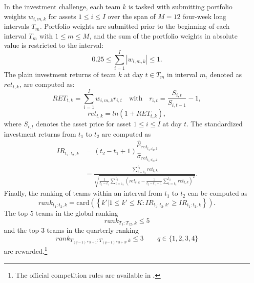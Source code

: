 \documentclass[3p,times,twocolumn]{elsarticle}
\begin{document}
In the investment challenge, each team $k$ is tasked with submitting portfolio weights $w_{i,m,k}$ for assets $1 \leq i \leq I$ over the span of $M=12$ four-week long intervals $T_{m}$.
Portfolio weights are submitted prior to the beginning of each interval $T_{m}$ with $1 \leq m \leq M$, and the sum of the portfolio weights in absolute value is restricted to the interval:
\begin{equation}
    0.25 \leq \sum_{i=1}^{I}|w_{i,m,k}|\leq 1.
\end{equation}
The plain investment returns of team $k$ at day $t \in T_m$ in interval $m$, denoted as $ret_{t,k}$, are computed as:
\begin{equation}
    RET_{t,k}= \sum_{i=1}^{I} w_{i,m,k} r_{i,t} \quad \text{with} \quad r_{i,t}=\frac{S_{i,t}}{S_{i,t-1}}-1,
\end{equation}
\begin{equation}\label{eq:log_transform}
    ret_{t,k}= ln(1+RET_{t,k}),
\end{equation}
where $S_{i,t}$ denotes the asset price for asset $1 \leq i \leq I$ at day $t$.
The standardized investment returns from $t_1$ to $t_2$ are computed as
\begin{equation}\label{eq:ir_definition}
    \begin{split}
        IR_{t_1:t_2,k}&= (t_2-t_1+1)\dfrac{\widehat{\mu}_{ret_{t_1:t_2,k}}}{\widehat{\sigma}_{ret_{t_1:t_2,k}}}\\
        &= \frac{\sum\limits_{t=t_1}^{t_{2}} ret_{t,k}}{\sqrt{\frac{1}{t_2 - t_1}\sum\limits_{t=t_1}^{t_2}\left( ret_{t,k} - \frac{1}{t_2 - t_1 + 1}\sum\limits_{t=t_1}^{t_{2}} ret_{t,k} \right)^{2}}}.
    \end{split}
\end{equation}
Finally, the ranking of teams within an interval from $t_1$ to $t_2$ can be computed as
\begin{equation}
    rank_{t_1:t_2,k}=\textrm{card}(\left\{ k'| 1 \leq k' \leq K: IR_{t_1:t_2,k'} \geq IR_{t_1:t_2,k} \right\}).
\end{equation}
The top 5 teams in the global ranking
\begin{equation}
    rank_{T_{1}:T_{12},k} \leq 5
\end{equation}
and the top 3 teams in the quarterly ranking
\begin{equation}
    rank_{T_{(q-1)*3+1}:T_{(q-1)*3+3},k} \leq 3 \qquad q \in \{1,2,3,4\}
\end{equation}
are rewarded.\footnote{
    The official competition rules are available in \citet{makridakisM6FinancialDuathlon2022}.
}
\end{document}
